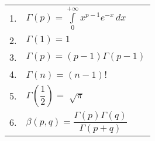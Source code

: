 \documentclass{article}
\begin{document}
\begin{tabular}{cl}
  1. & $ \Gamma\left(p\right) = \displaystyle\int\limits_{0}^{+\infty} x^{p-1} e^{-x}\,dx$                    \\
  2. & $ \Gamma\left(1\right) = 1 $                                                                           \\
  3. & $ \Gamma\left(p\right) = \left(p-1\right)\Gamma \left(p-1\right)  $                                    \\
  4. & $ \Gamma\left(n\right) = \left(n-1\right)$!                                                            \\
  5. & $ \Gamma\left(\dfrac{1}{2}\right) = \sqrt[]{\pi} $                                                     \\
  6. & $ \beta \left(p, q\right) = \dfrac{\Gamma\left(p\right)\Gamma\left(q\right)}{\Gamma\left(p+q\right)} $ \\
\end{tabular}
\end{document}
